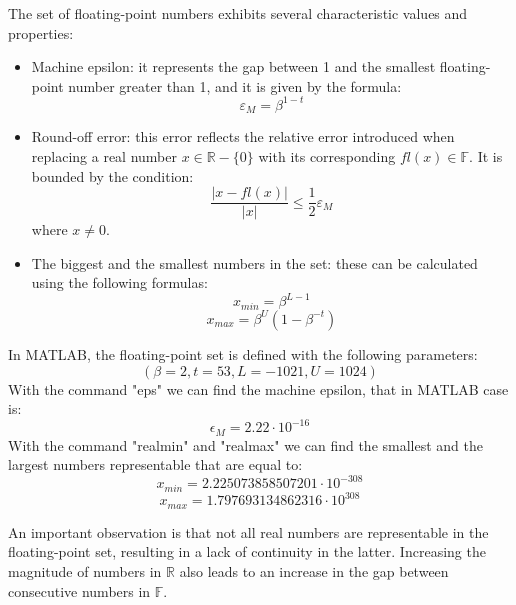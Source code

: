 \documentclass[12pt, a4paper]{report}
\begin{document}
    The set of floating-point numbers exhibits several characteristic values and properties:
    \begin{itemize}
        \item Machine epsilon: it represents the gap between 1 and the smallest floating-point number greater than 1, and it is given by the formula:
            \[\varepsilon_M=\beta^{1-t}\]
        \item Round-off error: this error reflects the relative error introduced when replacing a real number $x \in \mathbb{R}-\{0\}$ with its corresponding $fl(x) \in \mathbb{F}$. 
            It is bounded by the condition:
            \[\dfrac{\left\lvert x-fl(x) \right\rvert}{\left\lvert x \right\rvert }\leq \dfrac{1}{2}\varepsilon_M\]
            where $x \neq 0$.
        \item The biggest and the smallest numbers in the set: these can be calculated using the following formulas:
            \[x_{min}=\beta^{L-1}\]
            \[x_{max}=\beta^U(1-\beta^{-t})\]
    \end{itemize}
    \begin{example}
        In MATLAB, the floating-point set is defined with the following parameters:
        \[(\beta=2,t=53,L=-1021,U=1024)\] 
        With the command "eps" we can find the machine epsilon, that in MATLAB case is:
        \[\epsilon_M=2.22 \cdot 10^{-16}\]
        With the command "realmin" and "realmax" we can find the smallest and the largest numbers representable that are equal to:
        \[x_{min}=2.225073858507201 \cdot 10^{-308}\]
        \[x_{max}=1.797693134862316 \cdot 10^{308}\]
    \end{example}
    An important observation is that not all real numbers are representable in the floating-point set, resulting in a lack of continuity in the latter. 
    Increasing the magnitude of numbers in $\mathbb{R}$ also leads to an increase in the gap between consecutive numbers in $\mathbb{F}$. 
\end{document}

